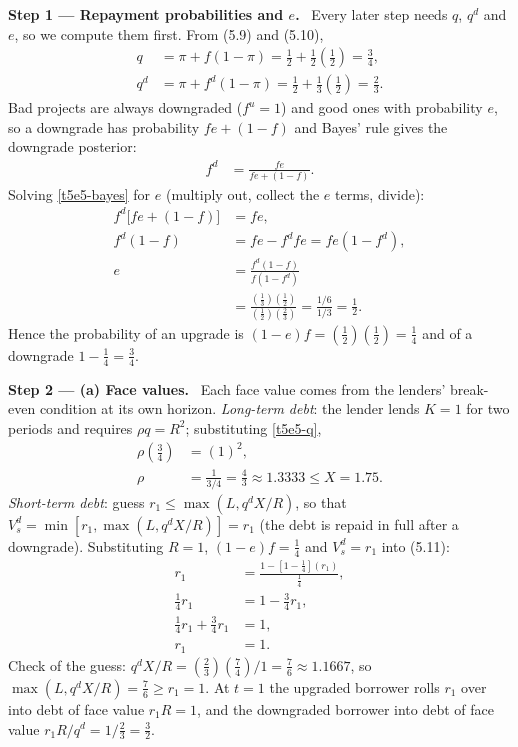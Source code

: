 \documentclass[11pt,a4paper]{article}
\newcommand{\step}[2]{\par\medskip\noindent\textbf{Step #1 --- #2.}~}
\begin{document}
\step{1}{Repayment probabilities and $e$} Every later step needs $q$, $q^d$ and $e$, so we compute them
first. From (5.9) and (5.10),
\begin{align}
  q &= \pi+f(1-\pi) = \tfrac12+\tfrac12\left(\tfrac12\right) = \tfrac34, \label{t5e5-q}\\
  q^d &= \pi+f^d(1-\pi) = \tfrac12+\tfrac13\left(\tfrac12\right) = \tfrac23. \label{t5e5-qd}
\end{align}
Bad projects are always downgraded ($f^u=1$) and good ones with probability $e$, so a downgrade has
probability $fe+(1-f)$ and Bayes' rule gives the downgrade posterior:
\begin{align}
  f^d &= \frac{fe}{fe+(1-f)}. \label{t5e5-bayes}
\end{align}
Solving \eqref{t5e5-bayes} for $e$ (multiply out, collect the $e$ terms, divide):
\begin{align}
  f^d\bigl[fe+(1-f)\bigr] &= fe, \nonumber\\
  f^d(1-f) &= fe-f^dfe = fe(1-f^d), \nonumber\\
  e &= \frac{f^d(1-f)}{f(1-f^d)} \label{t5e5-e}\\
    &= \frac{\left(\tfrac13\right)\left(\tfrac12\right)}{\left(\tfrac12\right)\left(\tfrac23\right)}
     = \frac{1/6}{1/3} = \tfrac12. \nonumber
\end{align}
Hence the probability of an upgrade is $(1-e)f=\left(\tfrac12\right)\left(\tfrac12\right)=\tfrac14$ and of a
downgrade $1-\tfrac14=\tfrac34$.

\step{2}{(a) Face values} Each face value comes from the lenders' break-even condition at its own
horizon. \emph{Long-term debt}: the lender lends $K=1$ for two periods and requires $\rho q=R^2$;
substituting \eqref{t5e5-q},
\begin{align}
  \rho\left(\tfrac34\right) &= (1)^2, \nonumber\\
  \rho &= \frac{1}{3/4}=\tfrac43\approx1.3333\leq X=1.75. \label{t5e5-rho}
\end{align}
\emph{Short-term debt}: guess $r_1\leq\max(L,q^dX/R)$, so that $V_s^d=\min[r_1,\max(L,q^dX/R)]=r_1$ (the
debt is repaid in full after a downgrade). Substituting $R=1$, $(1-e)f=\tfrac14$ and $V_s^d=r_1$ into (5.11):
\begin{align}
  r_1 &= \frac{1-\left[1-\tfrac14\right](r_1)}{\tfrac14}, \nonumber\\
  \tfrac14r_1 &= 1-\tfrac34r_1, \nonumber\\
  \tfrac14r_1+\tfrac34r_1 &= 1, \nonumber\\
  r_1 &= 1. \label{t5e5-r1}
\end{align}
Check of the guess: $q^dX/R=\left(\tfrac23\right)\left(\tfrac74\right)/1=\tfrac76\approx1.1667$, so
$\max(L,q^dX/R)=\tfrac76\geq r_1=1$. At $t=1$ the upgraded borrower rolls $r_1$ over into debt of face
value $r_1R=1$, and the downgraded borrower into debt of face value $r_1R/q^d=1/\tfrac23=\tfrac32$.
\end{document}
